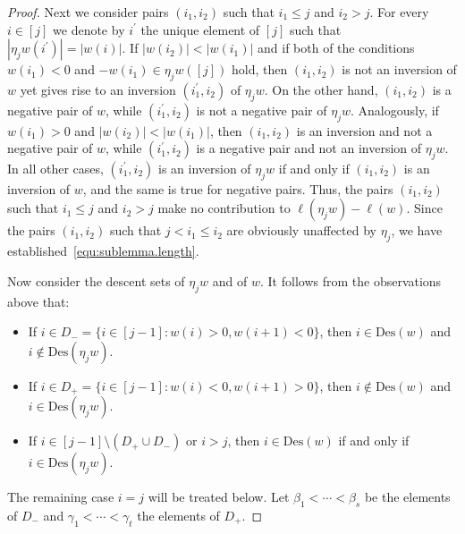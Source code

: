 \documentclass[11pt,a4paper]{amsart}
\theoremstyle{plain}
\theoremstyle{remark}
\begin{document}
\begin{proof}
Next we consider pairs $(i_1, i_2)$ such that $i_1 \leq j$ and $i_2 > j$.  For every $i \in [j]$ we denote by $i^\prime$ the unique element of $[j]$ such that $|\eta_j w(i^\prime)| = |w(i)|$.  If $| w(i_2) | < |w(i_1)|$ and if both of the conditions $w(i_1) < 0$ and $-w(i_1) \in \eta_j w([j])$ hold, then $(i_1, i_2)$ is not an inversion of $w$ yet gives rise to an inversion $(i_1^\prime, i_2)$ of $\eta_j w$.  On the other hand, $(i_1, i_2)$ is a negative pair of $w$, while $(i_1^\prime, i_2)$ is not a negative pair of $\eta_j w$.  Analogously, if $w(i_1) > 0$ and $| w(i_2) | < |w(i_1)|$, then $(i_1, i_2)$ is an inversion and not a negative pair of $w$, while $(i_1^\prime, i_2)$ is a negative pair and not an inversion of $\eta_j w$.  In all other cases, $(i_1^\prime, i_2)$ is an inversion of $\eta_j w$ if and only if $(i_1, i_2)$ is an inversion of $w$, and the same is true for negative pairs.  Thus, the pairs $(i_1, i_2)$ such that $i_1 \leq j$ and $i_2 > j$ make no contribution to $\ell(\eta_j w) - \ell(w)$.  Since the pairs $(i_1, i_2)$ such that $j < i_1 \leq i_2$ are obviously unaffected by $\eta_j$, we have established~\eqref{equ:sublemma.length}.

Now consider the descent sets of $\eta_j w$ and of $w$.  It follows from the observations above that:
\begin{itemize}
\item If $i \in D_- = \{ i \in [j-1]: w(i) > 0, w(i+1) < 0 \}$, then $i \in \mathrm{Des}(w)$ and $i \not\in \mathrm{Des}(\eta_j w)$.  
\item If $i \in D_+ = \{ i \in [j-1]: w(i) < 0, w(i+1) > 0 \}$, then $i \not\in \mathrm{Des}(w)$ and $i \in \mathrm{Des}(\eta_j w)$.  
\item If $i \in [j-1] \setminus (D_+ \cup D_-)$ or $i > j$, then $i \in \mathrm{Des}(w)$ if and only if $i \in \mathrm{Des}(\eta_j w)$.
\end{itemize}
The remaining case $i = j$ will be treated below.  Let $\beta_1 < \cdots < \beta_s$ be the elements of $D_-$ and $\gamma_1 < \cdots < \gamma_t$ the elements of $D_+$.


\end{proof}
\end{document}
